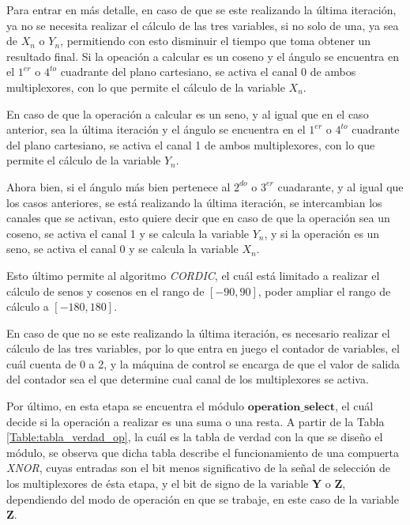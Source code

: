 Para entrar en más detalle, en caso de que se este realizando la última iteración, ya no se necesita realizar el cálculo de las tres variables, si no solo de una, ya sea de $X_{n}$ o $Y_{n}$, permitiendo con esto disminuir el tiempo que toma obtener un resultado final. Si la opeación a calcular es un coseno y el ángulo se encuentra en el $1^{er}$ o $4^{to}$ cuadrante del plano cartesiano, se activa el canal 0 de ambos multiplexores, con lo que permite el cálculo de la variable $X_{n}$.

En caso de que la operación a calcular es un seno, y al igual que en el caso anterior, sea la última iteración y el ángulo se encuentra en el $1^{er}$ o $4^{to}$ cuadrante del plano cartesiano, se activa el canal 1 de ambos multiplexores, con lo que permite el cálculo de la variable $Y_{n}$.

Ahora bien, si el ángulo más bien pertenece al $2^{do}$ o $3^{er}$ cuadarante, y al igual que los casos anteriores, se está realizando la última iteración, se intercambian los canales que se activan, esto quiere decir que en caso de que la operación sea un coseno, se activa el canal 1 y se calcula la variable $Y_{n}$, y si la operación es un seno, se activa el canal 0 y se calcula la variable  $X_{n}$.

Esto último permite al algoritmo \textit{CORDIC}, el cuál está limitado a realizar el cálculo de senos y cosenos en el rango de $[-90,90]$, poder ampliar el rango de cálculo a $[-180,180]$.

En caso de que no se este realizando la última iteración, es necesario realizar el cálculo de las tres variables, por lo que entra en juego el contador de variables, el cuál cuenta de 0 a 2, y la máquina de control se encarga de que el valor de salida del contador sea el que determine cual canal de los multiplexores se activa.

Por último, en esta etapa se encuentra el módulo $\textbf{operation\_select}$, el cuál decide si la operación a realizar es una suma o una resta. A partir de la Tabla \ref{Table:tabla_verdad_op}, la cuál es la tabla de verdad con la que se diseño el módulo, se observa que dicha tabla describe el funcionamiento de una compuerta \textit{XNOR}, cuyas entradas son el bit menos significativo de la señal de selección de los multiplexores de ésta etapa, y el bit de signo de la variable \textbf{Y} o \textbf{Z}, dependiendo del modo de operación en que se trabaje, en este caso de la variable \textbf{Z}.

